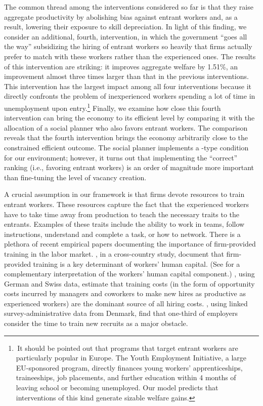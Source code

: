\documentclass[12pt]{article} %
\theoremstyle{definition}
\begin{document}
The common thread among the interventions considered so far is that they raise aggregate productivity by abolishing bias against entrant workers and, as a result, lowering their exposure to skill depreciation.
In light of this finding, we consider an additional, fourth, intervention, in which the government ``goes all the way'' subsidizing the hiring of entrant workers so heavily that firms actually prefer to match with these workers rather than the experienced ones. 
The results of this intervention are striking: it improves aggregate welfare by 1.51\%, an improvement almost three times larger than that in the previous interventions.
This intervention has the largest impact among all four interventions because it directly confronts the problem of inexperienced workers spending a lot of time in unemployment upon entry.\footnote{\,It should be pointed out that programs that target entrant workers are particularly popular in Europe.
The Youth Employment Initiative, a large EU-sponsored program, directly finances young workers' apprenticeships, traineeships, job placements, and further education within 4 months of leaving school or becoming unemployed.
Our model predicts that interventions of this kind generate sizable welfare gains.}
Finally, we examine how close this fourth intervention can bring the economy to its efficient level by comparing it with the allocation of a social planner who also favors entrant workers. 
The comparison reveals that the fourth intervention brings the economy arbitrarily close to the constrained efficient outcome. 
The social planner implements a \cite{hosios1990efficiency}-type condition for our environment; however, it turns out that implementing the ``correct'' ranking (i.e., favoring entrant workers) is an order of magnitude more important than fine-tuning the level of vacancy creation.


A crucial assumption in our framework is that firms devote resources to train entrant workers.
These resources capture the fact that the experienced workers have to take time away from production to teach the necessary traits to the entrants. 
Examples of these traits include the ability to work in teams, follow instructions, understand and complete a task, or how to network.
There is a plethora of recent empirical papers documenting the importance of firm-provided training in the labor market.
\cite{ma2022human}, in a cross-country study, document that firm-provided training is a key determinant of workers' human capital. (See \cite{herkenhoff2024production} for a complementary interpretation of the workers' human capital component.)
\cite{faccini2022importance}, using German and Swiss data, estimate that training costs (in the form of opportunity costs incurred by managers and coworkers to make new hires as productive as experienced workers) are the dominant source of all hiring costs.
\cite{bertheau2023makes}, using linked survey-administrative data from Denmark, find that one-third of employers consider the time to train new recruits as a major obstacle.
\end{document}
